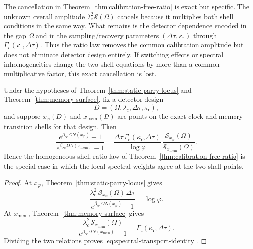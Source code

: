 \begin{remark}\label{rem:ratio-law-parameters}
The cancellation in Theorem~\ref{thm:calibration-free-ratio} is exact but specific. The unknown overall amplitude $\lambda_c^2\mathcal S(\Omega)$ cancels because it multiplies both shell conditions in the same way. What remains is the detector dependence encoded in the gap $\Omega$ and in the sampling/recovery parameters $(\Delta\tau,\kappa_{\mathrm r})$ through $\Gamma_c(\kappa_{\mathrm r},\Delta\tau)$. Thus the ratio law removes the common calibration amplitude but does not eliminate detector design entirely. If switching effects or spectral inhomogeneities change the two shell equations by more than a common multiplicative factor, this exact cancellation is lost.
\end{remark}

\begin{corollary}\label{cor:spectral-transport-identity}
Under the hypotheses of Theorem~\ref{thm:static-parry-locus} and Theorem~\ref{thm:memory-surface}, fix a detector design
\[
D=(\Omega,\lambda_c,\Delta\tau,\kappa_{\mathrm r}),
\]
and suppose $x_\varphi(D)$ and $x_{\mathrm{mem}}(D)$ are points on the exact-clock and memory-transition shells for that design. Then
\begin{equation}\label{eq:spectral-transport-identity}
\frac{e^{\beta_\infty\Omega N(x_\varphi)}-1}
     {e^{\beta_\infty\Omega N(x_{\mathrm{mem}})}-1}
=
\frac{\Delta\tau\,\Gamma_c(\kappa_{\mathrm r},\Delta\tau)}{\log\varphi}\,
\frac{\mathcal S_{x_\varphi}(\Omega)}{\mathcal S_{x_{\mathrm{mem}}}(\Omega)}.
\end{equation}
Hence the homogeneous shell-ratio law of Theorem~\ref{thm:calibration-free-ratio} is the special case in which the local spectral weights agree at the two shell points.
\end{corollary}

\begin{proof}
At $x_\varphi$, Theorem~\ref{thm:static-parry-locus} gives
\[
\frac{\lambda_c^2\,\mathcal S_{x_\varphi}(\Omega)\,\Delta\tau}
     {e^{\beta_\infty\Omega N(x_\varphi)}-1}
=
\log\varphi.
\]
At $x_{\mathrm{mem}}$, Theorem~\ref{thm:memory-surface} gives
\[
\frac{\lambda_c^2\,\mathcal S_{x_{\mathrm{mem}}}(\Omega)}
     {e^{\beta_\infty\Omega N(x_{\mathrm{mem}})}-1}
=
\Gamma_c(\kappa_{\mathrm r},\Delta\tau).
\]
Dividing the two relations proves \eqref{eq:spectral-transport-identity}.
\end{proof}

